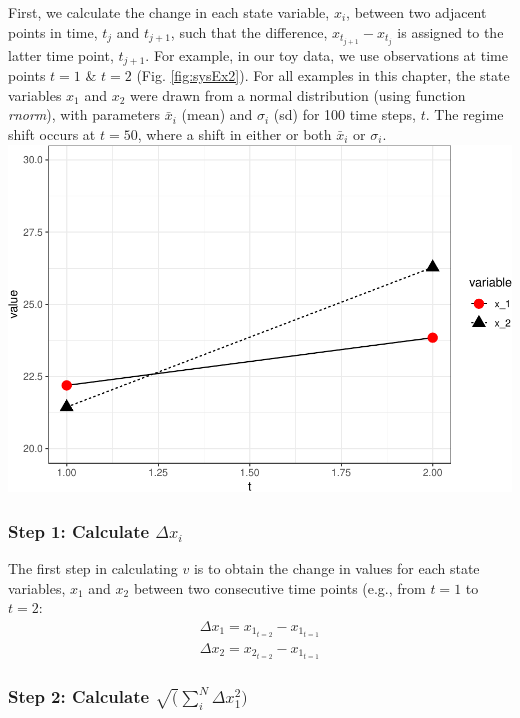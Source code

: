 \documentclass[12pt,twoside,openany]{reedthesis}
\begin{document}
First, we calculate the change in each state variable, \(x_i\), between two adjacent points in time, \(t_j\) and \(t_{j+1}\), such that the difference, \(x_{t_{j+1}} - x_{t_j}\) is assigned to the latter time point, \(t_{j+1}\). For example, in our toy data, we use observations at time points \(t = 1\) \& \(t=2\) (Fig. \ref{fig:sysEx2}). For all examples in this chapter, the state variables \(x_1\) and \(x_2\) were drawn from a normal distribution (using function \emph{rnorm}), with parameters \(\bar{x}_i\) (mean) and \(\sigma_i\) (sd) for 100 time steps, \(t\). The regime shift occurs at \(t=50\), where a shift in either or both \(\bar{x}_i\) or \(\sigma_i\).
\includegraphics{_myDissertation_files/figure-latex/sysEx2-1.pdf}

\hypertarget{step-1-calculate-delta-x_i}{%
\subsubsection{\texorpdfstring{Step 1: Calculate \(\Delta x_i\)}{Step 1: Calculate \textbackslash Delta x\_i}}\label{step-1-calculate-delta-x_i}}

The first step in calculating \(v\) is to obtain the change in values for each state variables, \(x_1\) and \(x_2\) between two consecutive time points (e.g., from \(t=1\) to \(t=2\):
\begin{equation}
\begin{array}{rcr}
\Delta x_1 = x_{1_{t=2}} - x_{1_{t=1}} \\
\Delta x_2 = x_{2_{t=2}} - x_{1_{t=1}}
  \end{array}
\label{eq:diffX}
\end{equation}
\hypertarget{step-2-calculate-sqrtsum_indelta-x_12}{%
\subsubsection{\texorpdfstring{Step 2: Calculate \(\sqrt(\sum_i^N\Delta x_1^2)\)}{Step 2: Calculate \textbackslash sqrt(\textbackslash sum\_i\^{}N\textbackslash Delta x\_1\^{}2)}}\label{step-2-calculate-sqrtsum_indelta-x_12}}
\end{document}
